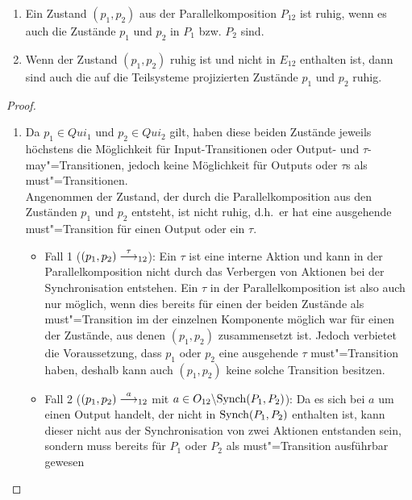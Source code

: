\begin{Lem}\mbox{}
  \label{RuheZustLem}
  \begin{enumerate}
    \item Ein Zustand $(p_1,p_2)$ aus der Parallelkomposition $P_{12}$ ist
      ruhig, wenn es auch die Zustände $p_1$ und $p_2$ in $P_1$ bzw. $P_2$
      sind.
    \item Wenn der Zustand $(p_1,p_2)$ ruhig ist und nicht in $E_{12}$
      enthalten ist, dann sind auch die auf die Teilsysteme projizierten
      Zustände $p_1$ und $p_2$ ruhig.
  \end{enumerate}
\end{Lem}
\begin{proof}\mbox{}
  \begin{enumerate}
    \item Da $p_1\in Qui_1$ und $p_2\in Qui_2$ gilt, haben diese beiden
      Zustände jeweils höchstens die Möglichkeit für Input-Transitionen oder
      Output- und $\tau$-may"=Transitionen, jedoch keine Möglichkeit für Outputs
      oder $\tau$s als must"=Transitionen.\\
      Angenommen der Zustand, der durch die Parallelkomposition aus den
      Zuständen $p_1$ und $p_2$ entsteht, ist nicht ruhig, d.h.\ er hat eine
      ausgehende must"=Transition für einen Output oder ein $\tau$.
      \begin{itemize}
        \item Fall 1 \big($(p_1,p_2)\must[\tau]_{12}$\big): Ein $\tau$ ist eine
          interne Aktion und kann in der Parallelkomposition nicht durch das
          Verbergen von Aktionen bei der Synchronisation entstehen. Ein $\tau$
          in der Parallelkomposition ist also auch nur möglich, wenn dies
          bereits für einen der beiden Zustände als must"=Transition im der
          einzelnen Komponente möglich war für einen der Zustände, aus denen
          $(p_1,p_2)$ zusammensetzt ist. Jedoch verbietet die Voraussetzung,
          dass $p_1$ oder $p_2$ eine ausgehende $\tau$ must"=Transition haben,
          deshalb kann auch $(p_1,p_2)$ keine solche Transition besitzen.
        \item Fall 2 \big($(p_1,p_2)\must[a]_{12}$ mit $a\in O_{12}\backslash
          \mathrm{Synch}(P_1,P_2)$\big): Da es sich bei $a$ um einen Output handelt, der
          nicht in $\mathrm{Synch} (P_1,P_2)$ enthalten ist, kann dieser nicht aus der
          Synchronisation von zwei Aktionen entstanden sein, sondern muss
          bereits für $P_1$ oder $P_2$ als must"=Transition ausführbar gewesen

\end{itemize}
\end{enumerate}
\end{proof}
